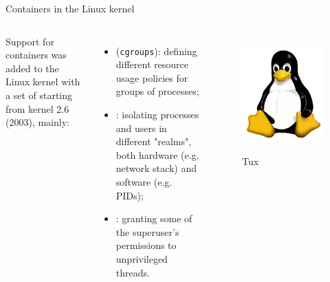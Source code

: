 \begin{frame}{Containers in the Linux kernel}
\begin{columns}
  Support for containers was added to the Linux kernel with a set of  starting from kernel 2.6 (2003), mainly:
  \begin{itemize}
    \item {} (\texttt{cgroups}): defining different resource usage policies for groups of processes;
    \item {}: isolating processes and users in different "realms", both hardware (e.g. network stack) and software (e.g. PIDs);
    \item {}: granting some of the superuser's permissions to unprivileged threads.
  \end{itemize}

  \begin{figure}
    \centering
    \includegraphics[scale=.2]{tux.png}
    \label{fig:tux}
    \caption{Tux}
  \end{figure}
\end{columns}
\end{frame}
